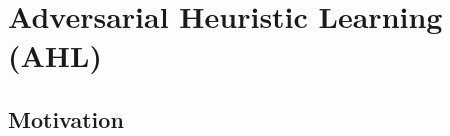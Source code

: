 %
%

\section{Adversarial Heuristic Learning (AHL)}
\label{sec:hl}

\subsection{Motivation}
\label{sec:hl-motivation}

